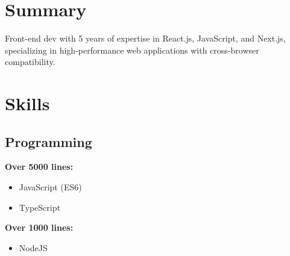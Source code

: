 \documentclass[letterpaper]{deedy-resume} %
\begin{document}
\begin{minipage}[t]{0.33\textwidth} %


\section{Summary}
Front-end dev with 5 years of expertise in React.js, JavaScript, and Next.js, specializing in high-performance web applications with cross-browser compatibility. 





\section{Skills}

\subsection{Programming}



\textbf{Over 5000 lines:}
\begin{itemize}
    \setlength\itemsep{-0.5em} %
    \item JavaScript (ES6)
    \item TypeScript
\end{itemize}


\vspace{-\topsep}



\textbf{Over 1000 lines:}
\vspace{-\topsep}
\begin{itemize}
    \setlength\itemsep{-0.5em} %
    \item NodeJS
\end{itemize}



\vspace{-\topsep}




\end{minipage}
\end{document}
